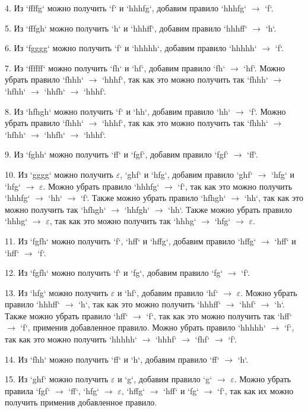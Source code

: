 \documentclass[a4paper, 14pt]{extarticle}
\begin{document}
4. Из `ffffg` можно получить `f` и `hhhfg`, добавим правило `hhhfg` $\rightarrow$ `f`.

5. Из `fffgh` можно получить `h` и `hhhff`, добавим правило `hhhff` $\rightarrow$ `h`.

6. Из `fgggg` можно получить `f` и `hhhhh`, добавим правило `hhhhh` $\rightarrow$ `f`.

7. Из `ffffff` можно получить `fh` и `hf`, добавим правило `fh` $\rightarrow$ `hf`. Можно убрать правило `fhhh` $\rightarrow$ `hhhf`, так как это можно получить так `fhhh` $\rightarrow$ `hfhh` $\rightarrow$ `hhfh` $\rightarrow$ `hhhf`.

8. Из `hfhgh` можно получить `f` и `hh`, добавим правило `hh` $\rightarrow$ `f`. Можно убрать правило `fhhh` $\rightarrow$ `hhhf`, так как это можно получить так `fhhh` $\rightarrow$ `hfhh` $\rightarrow$ `hhfh` $\rightarrow$ `hhhf`. 

9. Из `fghh` можно получить `ff` и `fgf`, добавим правило `fgf` $\rightarrow$ `ff`. 

10. Из `gggg` можно получить $\varepsilon$, `ghf` и `hfg`, добавим правило `ghf` $\rightarrow$ `hfg` и `hfg` $\rightarrow$ $\varepsilon$. Можно убрать правило `hhhfg` $\rightarrow$ `f`, так как это можно получить `hhhfg` $\rightarrow$ `hh` $\rightarrow$ `f`. Также можно убрать правило `hfhgh` $\rightarrow$ `hh`, так как это можно получить так `hfhgh` $\rightarrow$ `hhfgh` $\rightarrow$ `hh`. Также можно убрать правило `hhhg` $\rightarrow$ $\varepsilon$, так как это можно получить так `hhhg` $\rightarrow$ `hfg` $\rightarrow$ $\varepsilon$.

11. Из `fgfh` можно получить `f`, `hff` и `hffg`, добавим правило `hffg` $\rightarrow$ `hff` и `hff` $\rightarrow$ `f`. 

12. Из `fgfh` можно получить `f` и `fg`, добавим правило `fg` $\rightarrow$ `f`. 

13. Из `hfg` можно получить $\varepsilon$ и `hf`, добавим правило `hf` $\rightarrow$ $\varepsilon$. Можно убрать правило `hhhff` $\rightarrow$ `h`, так как это можно получить `hhhff` $\rightarrow$ `hhf` $\rightarrow$ `h`. Также можно убрать правило `hff` $\rightarrow$ `f`, так как это можно получить так `hff` $\rightarrow$ `f`, применив добавленное правило. Можно убрать правило `hhhhh` $\rightarrow$ `f`, так как это можно получить `hhhhh` $\rightarrow$ `hhhf` $\rightarrow$ `fhf` $\rightarrow$ `f`.

14. Из `fhh` можно получить `ff` и `h`, добавим правило `ff` $\rightarrow$ `h`. 

15. Из `ghf` можно получить $\varepsilon$ и `g`, добавим правило `g` $\rightarrow$ $\varepsilon$. Можно убрать правила `fgf` $\rightarrow$ `ff`, `hfg` $\rightarrow$ $\varepsilon$, `hffg` $\rightarrow$ `hff` и `fg` $\rightarrow$ `f`, так как их можно получить применив добавленное правило.
\end{document}
